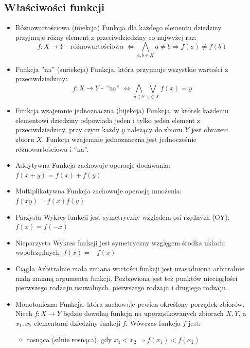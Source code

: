 \documentclass[14pt,a4paper]{extarticle}
\begin{document}
\subsection{Właściwości funkcji}
\begin{itemize}
   \item Różnowartościowa (iniekcja)\hfill\break
      Funkcja dla każdego elementu dziedziny przyjmuje różny element z przeciwdziedziny co najwyżej raz:
      $$f:X \rightarrow Y \text{ - różnowartościowa } \Leftrightarrow \underset{a, b \in X}{\bigwedge} a \neq b \Rightarrow f(a) \neq f(b)$$
   \item Funkcja ''na'' (suriekcja)\hfill\break
      Funkcja, która przyjmuje wszystkie wartości z przeciwdziedziny:
      $$f:X \rightarrow Y \text{ - ''na'' } \Leftrightarrow \underset{y \in Y}{\bigwedge} \underset{x \in X}{\bigvee} f(x) = y$$
   \item Funkcja wzajemnie jednoznaczna (bijekcja)\hfill\break
      Funkcja, w którek każdemu elementowi dziedziny odpowiada jeden i tylko jeden element z przeciwdziedziny,
      przy czym każdy $y$ należący do zbioru $Y$ jest obrazem zbioru $X$.
      Funkcja wzajemnie jednoznaczna jest jednocześnie różnowartościowa i ''na''.
   \item Addytywna\hfill\break
      Funkcja zachowuje operację dodawania: $f(x + y) = f(x) + f(y)$
   \item Multiplikatywna\hfill\break
      Funkcja zachowuje operację mnożenia: $f(xy) = f(x)f(y)$
   \item Parzysta\hfill\break
      Wykres funkcji jest symetryczny względem osi rzędnych (OY): $f(x) = f(-x)$
   \item Nieparzysta\hfill\break
      Wykres funkcji jest symetryczny wzglęgem środka układu współrzędnych: $f(x) = -f(x)$
   \item Ciągła\hfill\break
      Arbitralnie mała zmiana wartości funkcji jest uzasadniona arbitralnie małą zmianą argumentu funkcji.
      Pozbawiona jest też punktów nieciągłości pierwszego rodzaju usuwalnych, pierwszego rodzaju i drugiego rodzaju.
   \item Monotoniczna\hfill\break
      Funkcja, która zachowuje pewien określony porządek zbiorów. Niech $f:X\rightarrow Y$ będzie
      dowolną funkcją na uporządkowanych zbiorach $X, Y$, a $x_{1}, x_{2}$ elementami dziedziny funkcji $f$.
      Wówczas funkcja $f$ jest:
      \begin{itemize}
         \item rosnąca (silnie rosnąca), gdy $x_{1} < x_{2} \Rightarrow f(x_{1}) < f(x_{2})$

\end{itemize}
\end{itemize}
\end{document}
